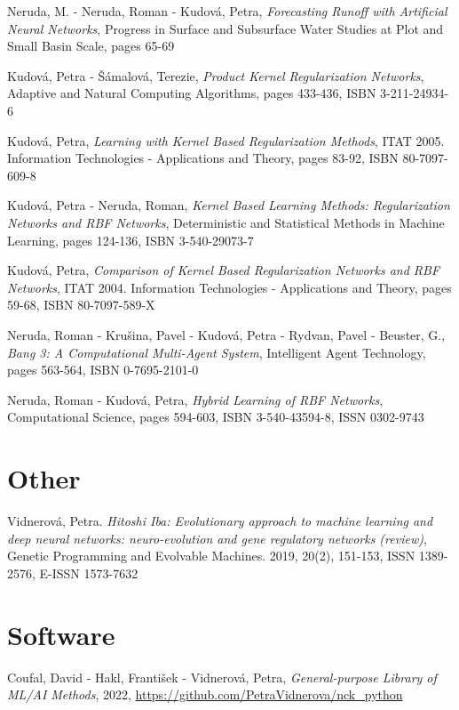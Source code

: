 \vspace{0.4em}
\noindent
Neruda, M. - Neruda, Roman - Kudová, Petra, {\em Forecasting Runoff with Artificial Neural Networks}, Progress in Surface and Subsurface Water Studies at Plot and Small Basin Scale, pages 65-69

\vspace{0.4em}
\noindent
Kudová, Petra - Šámalová, Terezie, {\em Product Kernel Regularization Networks}, Adaptive and Natural Computing Algorithms, pages 433-436, ISBN 3-211-24934-6

\vspace{0.4em}
\noindent
Kudová, Petra, {\em Learning with Kernel Based Regularization Methods}, ITAT 2005. Information Technologies - Applications and Theory, pages 83-92, ISBN 80-7097-609-8

\vspace{0.4em}
\noindent
Kudová, Petra - Neruda, Roman, {\em Kernel Based Learning Methods: Regularization Networks and RBF Networks}, Deterministic and Statistical Methods in Machine Learning, pages 124-136, ISBN 3-540-29073-7

\vspace{0.4em}
\noindent
Kudová, Petra, {\em Comparison of Kernel Based Regularization Networks and RBF Networks}, ITAT 2004. Information Technologies - Applications and Theory, pages 59-68, ISBN 80-7097-589-X

\vspace{0.4em}
\noindent
Neruda, Roman - Krušina, Pavel - Kudová, Petra - Rydvan, Pavel - Beuster, G., {\em Bang 3: A Computational Multi-Agent System}, Intelligent Agent Technology, pages 563-564, ISBN 0-7695-2101-0

\vspace{0.4em}
\noindent
Neruda, Roman - Kudová, Petra, {\em Hybrid Learning of RBF Networks}, Computational Science, pages 594-603, ISBN 3-540-43594-8, ISSN 0302-9743

\vspace{0.4em}
\noindent

\section{Other}
Vidnerová, Petra. {\em Hitoshi Iba: Evolutionary approach to machine learning and deep neural networks: neuro-evolution and gene regulatory networks (review)}, Genetic Programming and Evolvable Machines. 2019, 20(2), 151-153, ISSN 1389-2576, E-ISSN 1573-7632 

\section{Software}
Coufal, David - Hakl, František - Vidnerová, Petra, {\em General-purpose Library of ML/AI Methods}, 2022, \href{https://github.com/PetraVidnerova/nck_python}{https://github.com/PetraVidnerova/nck\_python}

